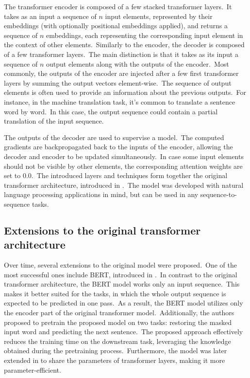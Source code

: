 \documentclass[longabstract, english, mgr]{iithesis}
\theoremstyle{default_theorem_style}\newtheorem{theorem}{Theorem}
\theoremstyle{default_theorem_style}\newtheorem{definition}{Definition}
\begin{document}
\noindent The transformer encoder is composed of a few stacked transformer layers.\ It takes as an input a sequence of
$n$ input elements, represented by their embeddings (with optionally positional embeddings applied), and returns a
sequence of $n$ embeddings, each representing the corresponding input element in the context of other
elements.\ Similarly to the encoder, the decoder is composed of a few transformer layers.\ The main distinction is
that it takes as its input a sequence of $n$ output elements along with the outputs of the encoder.\ Most commonly,
the outputs of the encoder are injected after a few first transformer layers by summing the output vectors
element-wise.\ The sequence of output elements is often used to provide an information about the previous
outputs.\ For instance, in the machine translation task, it's common to translate a sentence word by word.\ In this
case, the output sequence could contain a partial translation of the input sequence.\newline

\noindent The outputs of the decoder are used to supervise a model.\ The computed gradients are backpropagated
back to the inputs of the encoder, allowing the decoder and encoder to be updated simultaneously.\ In case some
input elements should not be visible by other elements, the corresponding attention weights are set to $0.0$.\ The
introduced layers and techniques form together the original transformer architecture, introduced in
\cite{transformer_model}.\ The model was developed with natural language processing applications in mind, but
can be used in any sequence-to-sequence tasks.

\subsection{Extensions to the original transformer architecture}

Over time, several extensions to the original model were proposed.\ One of the most successful ones include BERT,
introduced in \cite{bert_model}.\ In contrast to the original transformer architecture, the BERT model works only
an input sequence.\ This makes it better suited for the tasks, in which the whole output sequence is expected
to be predicted in one pass.\ As a result, the BERT model utilizes only the encoder part of the original transformer
model.\ Additionally, the authors proposed to pretrain the proposed model on two tasks: restoring the masked input
word and predicting the next sentence.\ The proposed approach effectively reduces the training time on the downstream
task, leveraging the knowledge obtained during the pretraining process.\ Furthermore, the model was later
extended in \cite{albert_model} to share the parameters of transformer layers, making it more
parameter-efficient. \newline
\end{document}
